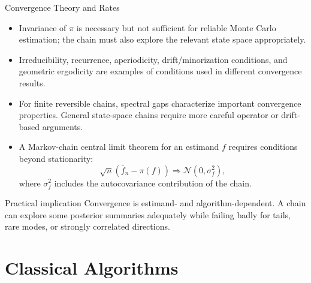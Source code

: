\documentclass[aspectratio=169,11pt]{beamer}
\begin{document}
\begin{frame}{Convergence Theory and Rates}
  \begin{itemize}
    \item Invariance of $\pi$ is necessary but not sufficient for reliable Monte Carlo estimation; the chain must also explore the relevant state space appropriately.
    \item Irreducibility, recurrence, aperiodicity, drift/minorization conditions, and geometric ergodicity are examples of conditions used in different convergence results.
    \item For finite reversible chains, spectral gaps characterize important convergence properties. General state-space chains require more careful operator or drift-based arguments.
    \item A Markov-chain central limit theorem for an estimand $f$ requires conditions beyond stationarity:
      \[\sqrt{n}(\bar f_n-\pi(f)) \Rightarrow \mathcal{N}(0,\sigma_f^2),\]
      where $\sigma_f^2$ includes the autocovariance contribution of the chain.
  \end{itemize}

  \begin{alertblock}{Practical implication}
    Convergence is estimand- and algorithm-dependent. A chain can explore some posterior summaries adequately while failing badly for tails, rare modes, or strongly correlated directions.
  \end{alertblock}
\end{frame}

\section{Classical Algorithms}
\end{document}
